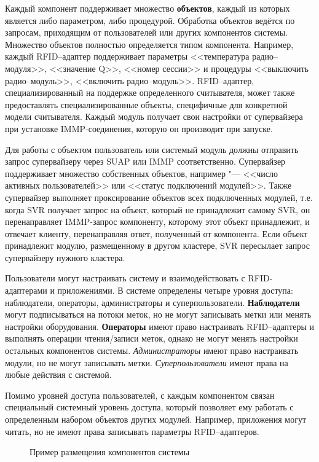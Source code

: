 Каждый компонент поддерживает множество \textbf{объектов}, каждый из которых является либо параметром, либо процедурой. Обработка объектов ведётся по запросам, приходящим от пользователей или других компонентов системы. Множество объектов полностью определяется типом компонента. Например, каждый RFID--адаптер поддерживает параметры <<температура радио--модуля>>, <<значение Q>>, <<номер сессии>> и процедуры <<выключить радио--модуль>>, <<включить радио--модуль>>. RFID--адаптер, специализированный на поддержке определенного считывателя, может также предоставлять специализированные объекты, специфичные для конкретной модели считывателя. Каждый модуль получает свои настройки от супервайзера при установке IMMP-соединения, которую он производит при запуске.

Для работы с объектом пользователь или системый модуль должны отправить запрос супервайзеру через SUAP или IMMP соответственно. Супервайзер поддерживает множество собственных объектов, например "--- <<число активных пользователей>> или <<статус подключений модулей>>. Также супервайзер выполняет проксирование объектов всех подключенных модулей, т.е. когда SVR получает запрос на объект, который не принадлежит самому SVR, он перенаправляет IMMP-запрос компоненту, которому этот объект принадлежит, и отвечает клиенту, перенаправляя ответ, полученный от компонента. Если объект принадлежит модулю, размещенному в другом кластере, SVR пересылает запрос супервайзеру нужного кластера.

Пользователи могут настраивать систему и взаимодействовать с RFID-адаптерами и приложениями. В системе определены четыре уровня доступа: наблюдатели, операторы, администраторы и суперпользователи. \textbf{Наблюдатели} могут подписываться на потоки меток, но не могут записывать метки или менять настройки оборудования. \textbf{Операторы} имеют право настраивать RFID--адаптеры и выполнять операции чтения/записи меток, однако не могут менять настройки остальных компонентов системы. \textit{Администраторы} имеют право настраивать модули, но не могут записывать метки. \textit{Суперпользователи} имеют права на любые действия с системой.

Помимо уровней доступа пользователей, с каждым компонентом связан специальный системный уровень доступа, который позволяет ему работать с определенным набором объектов других модулей. Например, приложения могут читать, но не имеют права записывать параметры RFID--адаптеров.

\begin{figure}[ht] 
  \caption{Пример размещения компонентов системы}
  \label{fig:ch5_deployment_example}
\end{figure}

